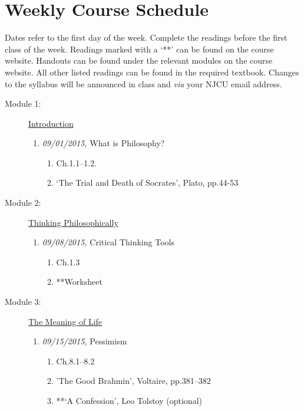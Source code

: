 \documentclass[article,oneside]{memoir}
\begin{document}
\section{Weekly Course Schedule}
Dates refer to the first day of the week. Complete the readings before the first class of the week. Readings marked with a `**' can be found on the course website. Handouts can be found under the relevant modules on the course website. All other listed readings can be found in the required textbook. Changes to the syllabus will be announced in class and \emph{via} your NJCU email address.

\begin{description}

\item[Module 1:] \href{http://scoconno.github.io/Teaching/Examined/Intro/}{Introduction}
\begin{enumerate}
\item \textit{09/01/2015,} What is Philosophy?
\begin{enumerate}
\item Ch.1.1--1.2.
\item `The Trial and Death of Socrates', Plato, pp.44-53
\end{enumerate}
\end{enumerate}

\item[Module 2:] \href{http://scoconno.github.io/Teaching/Examined/CT/}{Thinking Philosophically}
\begin{enumerate}
\item \textit{09/08/2015,} Critical Thinking Tools 
\begin{enumerate}
\item Ch.1.3
\item **Worksheet
\end{enumerate}
\end{enumerate}

\item[Module 3:] \href{http://scoconno.github.io/Teaching/Examined/Meaning/}{The Meaning of Life}

\begin{enumerate}
\item \textit{09/15/2015,} Pessimism 
\begin{enumerate}
\item Ch.8.1--8.2 
\item 'The Good Brahmin', Voltaire, pp.381--382
\item **`A Confession', Leo Tolstoy (optional)
\end{enumerate}


\end{enumerate}
\end{description}
\end{document}
